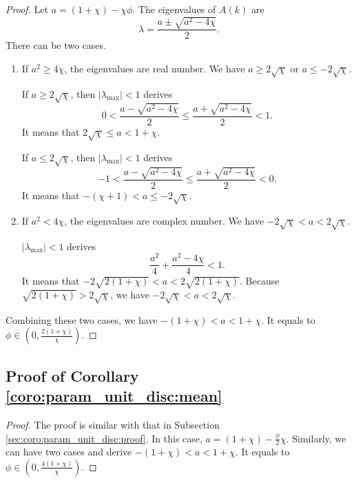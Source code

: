 \documentclass{sig-alternate}
\begin{document}
\begin{proof}
Let $ a = (1 + \chi) - \chi \phi $. 
The eigenvalues of $ A(k) $ are
\begin{equation}
\nonumber
 \lambda = \frac{ a \pm \sqrt{ a^{2} - 4 \chi } }{2} .
\end{equation}
There can be two cases.		
\begin{enumerate}
\item If $ a^{2} \geq 4 \chi $, the eigenvalues are real number.
We have $ a \geq 2 \sqrt{\chi} $ or $ a \leq - 2 \sqrt{\chi} $.
			
If $ a \geq 2 \sqrt{\chi} $, then $ | \lambda_{\max} | < 1 $ derives 
\begin{equation}
\nonumber
0 < \frac{a-\sqrt{a^{2}-4\chi}}{2} \leq \frac{a+\sqrt{a^{2}-4\chi}}{2} < 1 .
\end{equation}
It means that $ 2 \sqrt{ \chi } \leq a < 1 + \chi $.
			
If $ a \leq 2 \sqrt{\chi} $, then $ | \lambda_{\max} | < 1 $ derives
\begin{equation}
\nonumber
-1 < \frac{a-\sqrt{a^{2}-4\chi}}{2} \leq \frac{a+\sqrt{a^{2}-4\chi}}{2} < 0 .
\end{equation}
It means that $ - (\chi+1) < a \leq - 2 \sqrt{\chi} $.
			
\item If $ a^{2} < 4 \chi $, the eigenvalues are complex number.
We have $ - 2 \sqrt{\chi} < a < 2 \sqrt{\chi} $.
			
$ | \lambda_{\max} | < 1 $ derives
\begin{equation}
\nonumber
\frac{ a^{2} }{4} + \frac{ a^{2} - 4\chi }{4} < 1 .
\end{equation}
It means that $ - 2 \sqrt{ 2(1+\chi) } < a < 2 \sqrt{ 2(1+\chi) } $.
Because $ \sqrt{ 2(1+\chi) } > 2 \sqrt{ \chi } $, we have $ - 2 \sqrt{\chi} < a < 2 \sqrt{\chi} $.
\end{enumerate}
Combining these two cases, we have  $ - (1 + \chi) < a < 1 + \chi $.
It equals to $ \phi \in \left( 0 , \frac{2(1+\chi)}{\chi} \right) $.
\end{proof}		

\subsection{Proof of Corollary \ref{coro:param_unit_disc:mean}}
\label{sec:coro:param_unit_disc:proof:mean}

\begin{proof}
The proof is similar with that in Subsection \ref{sec:coro:param_unit_disc:proof}.
In this case, $ a = (1 + \chi) - \frac{ \phi }{2} \chi $.
Similarly, we can have two cases and derive
$ - (1 + \chi) < a < 1 + \chi $.
It equals to 
$
\phi \in \left( 0 , \frac{4(1+\chi)}{\chi} \right) .
$
\end{proof}
		


\end{document}

